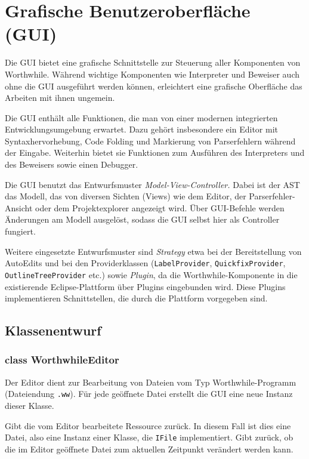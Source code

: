 \section{Grafische Benutzeroberfläche (GUI)}

Die GUI bietet eine grafische Schnittstelle zur Steuerung aller Komponenten von Worthwhile. Während wichtige Komponenten wie Interpreter und Beweiser auch ohne die GUI ausgeführt werden können, erleichtert eine grafische Oberfläche das Arbeiten mit ihnen ungemein.

Die GUI enthält alle Funktionen, die man von einer modernen integrierten Entwicklungsumgebung erwartet. Dazu gehört insbesondere ein Editor mit Syntaxhervorhebung, Code Folding und Markierung von Parserfehlern während der Eingabe. Weiterhin bietet sie Funktionen zum Ausführen des Interpreters und des Beweisers sowie einen Debugger.

Die GUI benutzt das Entwurfsmuster \textit{Model-View-Controller.} Dabei ist der AST das Modell, das von diversen Sichten (Views) wie dem Editor, der Parserfehler-Ansicht oder dem Projektexplorer angezeigt wird. Über GUI-Befehle werden Änderungen am Modell ausgelöst, sodass die GUI selbst hier als Controller fungiert.

Weitere eingesetzte Entwurfsmuster sind \textit{Strategy} etwa bei der Bereitstellung von AutoEdits und bei den Providerklassen (\texttt{LabelProvider}, \texttt{QuickfixProvider}, \texttt{OutlineTreeProvider} etc.) sowie \textit{Plugin}, da die Worthwhile-Komponente in die existierende Eclipse-Plattform über Plugins eingebunden wird. Diese Plugins implementieren Schnittstellen, die durch die Plattform vorgegeben sind.

\subsection{Klassenentwurf}

\subsubsection{class WorthwhileEditor}

Der Editor dient zur Bearbeitung von Dateien vom Typ Worthwhile-Programm (Dateiendung \texttt{.ww}). Für jede geöffnete Datei erstellt die GUI eine neue Instanz dieser Klasse.

\begin{description}
	 Gibt die vom Editor bearbeitete Ressource zurück. In diesem Fall ist dies eine Datei, also eine Instanz einer Klasse, die \texttt{IFile} implementiert.
	 Gibt zurück, ob die im Editor geöffnete Datei zum aktuellen Zeitpunkt verändert werden kann.
\end{description}

